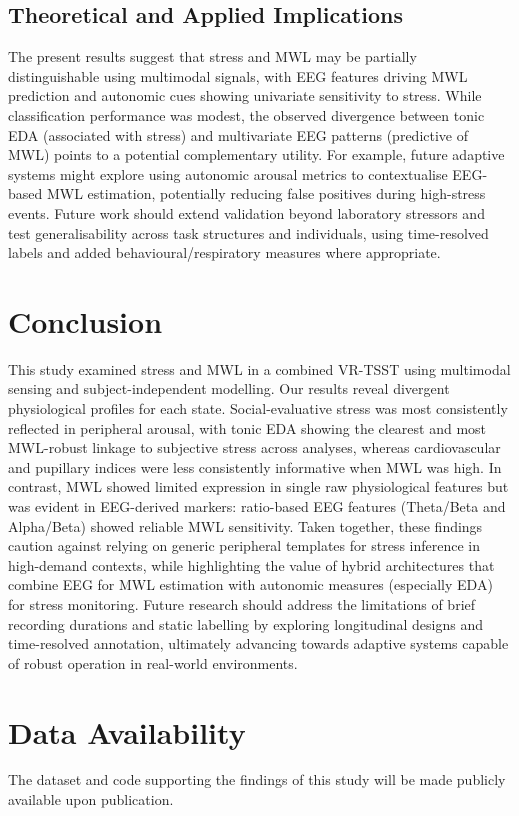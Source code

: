 \documentclass[lettersize,journal]{IEEEtran}
\begin{document}
\subsection{Theoretical and Applied Implications}

The present results suggest that stress and MWL may be partially distinguishable using multimodal signals, with EEG features driving MWL prediction and autonomic cues showing univariate sensitivity to stress. While classification performance was modest, the observed divergence between tonic EDA (associated with stress) and multivariate EEG patterns (predictive of MWL) points to a potential complementary utility. For example, future adaptive systems might explore using autonomic arousal metrics to contextualise EEG-based MWL estimation, potentially reducing false positives during high-stress events. Future work should extend validation beyond laboratory stressors and test generalisability across task structures and individuals, using time-resolved labels and added behavioural/respiratory measures where appropriate.


\section{Conclusion}
This study examined stress and MWL in a combined VR-TSST using multimodal sensing and subject-independent modelling. Our results reveal divergent physiological profiles for each state. Social-evaluative stress was most consistently reflected in peripheral arousal, with tonic EDA showing the clearest and most MWL-robust linkage to subjective stress across analyses, whereas cardiovascular and pupillary indices were less consistently informative when MWL was high. In contrast, MWL showed limited expression in single raw physiological features but was evident in EEG-derived markers: ratio-based EEG features (Theta/Beta and Alpha/Beta) showed reliable MWL sensitivity. Taken together, these findings caution against relying on generic peripheral templates for stress inference in high-demand contexts, while highlighting the value of hybrid architectures that combine EEG for MWL estimation with autonomic measures (especially EDA) for stress monitoring. Future research should address the limitations of brief recording durations and static labelling by exploring longitudinal designs and time-resolved annotation, ultimately advancing towards adaptive systems capable of robust operation in real-world environments.

\section*{Data Availability}
The dataset and code supporting the findings of this study will be made publicly available upon publication.






\newpage






\vfill
\end{document}
